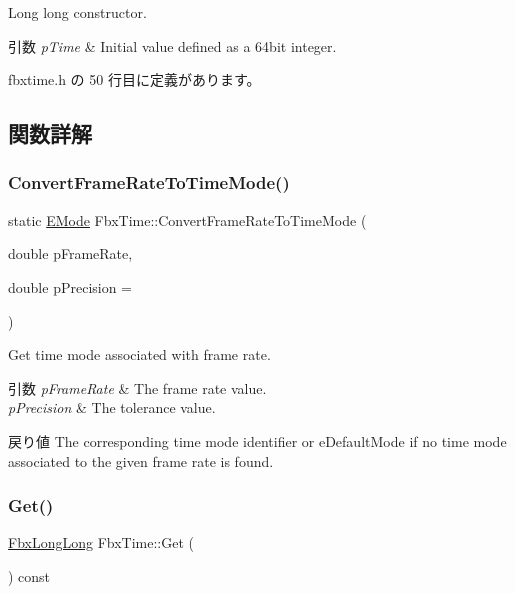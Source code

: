 Long long constructor. 
\begin{DoxyParams}{引数}
{\em p\+Time} & Initial value defined as a 64bit integer. \\
\hline
\end{DoxyParams}


 fbxtime.\+h の 50 行目に定義があります。



\subsection{関数詳解}
\mbox{\label{class_fbx_time_aac990ffad2cf969b6c1003cce20087e5}} 
\subsubsection{\texorpdfstring{Convert\+Frame\+Rate\+To\+Time\+Mode()}{ConvertFrameRateToTimeMode()}}
{\footnotesize\ttfamily static \hyperlink{class_fbx_time_acc529b00a0e8d4c3da3702449ca93031}{E\+Mode} Fbx\+Time\+::\+Convert\+Frame\+Rate\+To\+Time\+Mode (\begin{DoxyParamCaption}\item[{double}]{p\+Frame\+Rate,  }\item[{double}]{p\+Precision = {} }\end{DoxyParamCaption})\hspace{0.3cm}{\ttfamily [static]}}

Get time mode associated with frame rate. 
\begin{DoxyParams}{引数}
{\em p\+Frame\+Rate} & The frame rate value. \\
\hline
{\em p\+Precision} & The tolerance value. \\
\hline
\end{DoxyParams}
\begin{DoxyReturn}{戻り値}
The corresponding time mode identifier or {\ttfamily e\+Default\+Mode} if no time mode associated to the given frame rate is found. 
\end{DoxyReturn}
\mbox{\label{class_fbx_time_a17447886f905390b991a2d48ddb5a375}} 
\subsubsection{\texorpdfstring{Get()}{Get()}}
{\footnotesize\ttfamily \hyperlink{fbxtypes_8h_ac34da60c22b0a7e1156e5480da7d71f1}{Fbx\+Long\+Long} Fbx\+Time\+::\+Get (\begin{DoxyParamCaption}{ }\end{DoxyParamCaption}) const\hspace{0.3cm}{\ttfamily [inline]}}

